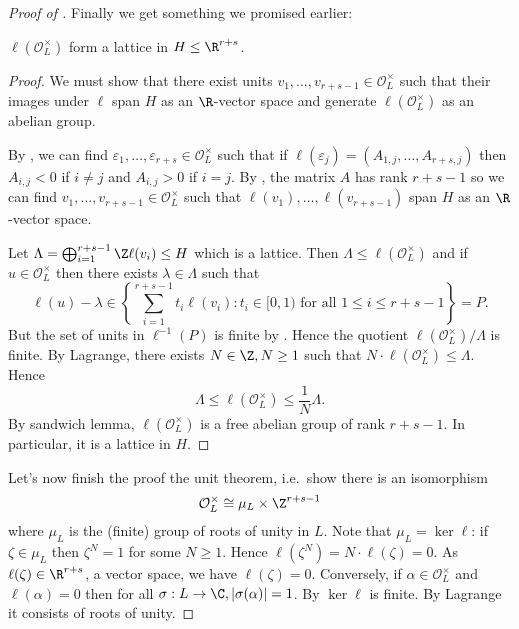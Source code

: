 \documentclass[a4paper]{article}
\renewcommand*{\O}{\mathcal{O}}
\begin{document}
\begin{proof}[Proof of ]
  Finally we get something we promised earlier:

  \begin{proposition}
    \(\ell(\O_L^\times)\) form a lattice in \(H \leq \R^{r + s}\).
  \end{proposition}

  \begin{proof}
    We must show that there exist units \(v_1, \dots, v_{r + s - 1} \in \O_L^\times\) such that their images under \(\ell\) span \(H\) as an \(\R\)-vector space and generate \(\ell(\O_L^\times)\) as an abelian group.

    By , we can find \(\varepsilon_1, \dots, \varepsilon_{r + s} \in \O_L^\times\) such that if \(\ell(\varepsilon_j) = (A_{1, j}, \dots, A_{r + s, j})\) then \(A_{i, j} < 0\) if \(i \neq j\) and \(A_{i, j} > 0\) if \(i = j\). By , the matrix \(A\) has rank \(r + s - 1\) so we can find \(v_1, \dots, v_{r + s - 1} \in \O_L^\times\) such that \(\ell(v_1), \dots, \ell(v_{r + s - 1})\) span \(H\) as an \(\R\)-vector space.

    Let \(\Lambda = \bigoplus_{i = 1}^{r + s - 1} \Z \ell(v_i) \leq H\) which is a lattice. Then \(\Lambda \leq \ell(\O_L^\times)\) and if \(u \in \O_L^\times\) then there exists \(\lambda \in \Lambda\) such that
    \[
      \ell(u) - \lambda \in \left\{ \sum_{i = 1}^{r + s - 1} t_i \ell(v_i): t_i \in [0, 1) \text{ for all } 1 \leq i \leq r + s - 1 \right\} = P.
    \]
    But the set of units in \(\ell^{-1}(P)\) is finite by . Hence the quotient \(\ell(\O_L^\times)/\Lambda\) is finite. By Lagrange, there exists \(N \in \Z, N \geq 1\) such that \(N \cdot \ell(\O_L^\times) \leq \Lambda\). Hence
    \[
      \Lambda \leq \ell(\O_L^\times) \leq \frac{1}{N} \Lambda.
    \]
    By sandwich lemma, \(\ell(\O_L^\times)\) is a free abelian group of rank \(r + s - 1\). In particular, it is a lattice in \(H\).
  \end{proof}

  Let's now finish the proof the unit theorem, i.e.\ show there is an isomorphism
  \[
    \O_L^\times \cong \mu_L \times \Z^{r + s - 1}
  \]
  where \(\mu_L\) is the (finite) group of roots of unity in \(L\). Note that \(\mu_L = \ker \ell\): if \(\zeta \in \mu_L\) then \(\zeta^N = 1\) for some \(N \geq 1\). Hence \(\ell(\zeta^N) = N\cdot \ell(\zeta) = 0\). As \(\ell(\zeta) \in \R^{r + s}\), a vector space, we have \(\ell(\zeta) = 0\). Conversely, if \(\alpha \in \O_L^\times\) and \(\ell(\alpha) = 0\) then for all \(\sigma: L \to \C, |\sigma(\alpha)| = 1\). By  \(\ker \ell\) is finite. By Lagrange it consists of roots of unity.


\end{proof}
\end{document}

